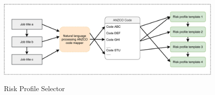\begin{figure}[!htb]
    \caption{Risk Profile Selector}
    \includegraphics[width=1.0\columnwidth]{fig/ANZCO_RiskProfile.pdf}
    \label{fig:anzcoriskprofile}
\end{figure}
